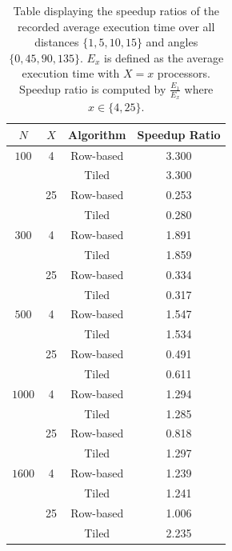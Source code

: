 \documentclass{article}
\begin{document}
    \begin{table}
    \caption{Table displaying the speedup ratios of the recorded average execution time over all distances $\{1, 5, 10, 15\}$ and angles $\{0, 45, 90, 135\}$. $E_x$ is defined as the average execution time with $X = x$ processors. Speedup ratio is computed by $\frac{E_1}{E_x}$ where $x \in \{4, 25\}$. }
        \begin{tabular}{c | c c  c}
         $N$ & $X$ & Algorithm & Speedup Ratio \\ \hline
        $ 100 $ & 4 & Row-based &  3.300 \\
        &   & Tiled & 3.300 \\
        &  25 & Row-based & 0.253 \\
        &   & Tiled & 0.280 \\ \hline
        $ 300 $ & 4 & Row-based & 1.891 \\
        &   & Tiled & 1.859 \\
        &  25 & Row-based & 0.334 \\
        &   & Tiled & 0.317 \\ \hline
        $ 500 $ & 4 & Row-based & 1.547 \\
        &   & Tiled & 1.534 \\
        &  25 & Row-based & 0.491 \\
        &   & Tiled & 0.611 \\ \hline
        $ 1000 $ & 4 & Row-based & 1.294 \\
        &   & Tiled & 1.285 \\
        &  25 & Row-based & 0.818\\
        &   & Tiled & 1.297 \\ \hline
        $ 1600 $ & 4 & Row-based & 1.239 \\
        &   & Tiled & 1.241 \\
        &  25 & Row-based & 1.006 \\
        &   & Tiled & 2.235 
    \end{tabular}
 \label{Tab:speedup}
\end{table}
\end{document}

